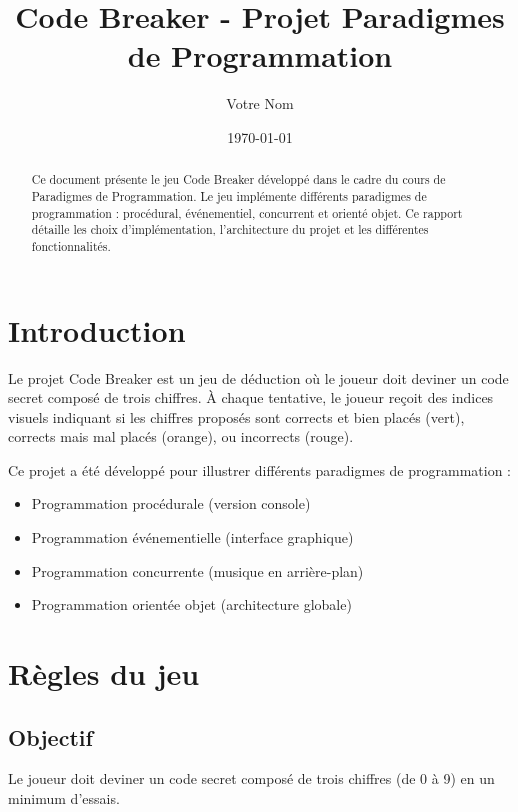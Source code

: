 \documentclass{article}
\title{Code Breaker - Projet Paradigmes de Programmation}
\author{Votre Nom}
\date{\today}
\begin{document}
\maketitle

\begin{abstract}
Ce document présente le jeu Code Breaker développé dans le cadre du cours de Paradigmes de Programmation. Le jeu implémente différents paradigmes de programmation : procédural, événementiel, concurrent et orienté objet. Ce rapport détaille les choix d'implémentation, l'architecture du projet et les différentes fonctionnalités.
\end{abstract}

\tableofcontents

\newpage

\section{Introduction}

Le projet Code Breaker est un jeu de déduction où le joueur doit deviner un code secret composé de trois chiffres. À chaque tentative, le joueur reçoit des indices visuels indiquant si les chiffres proposés sont corrects et bien placés (vert), corrects mais mal placés (orange), ou incorrects (rouge).

Ce projet a été développé pour illustrer différents paradigmes de programmation :
\begin{itemize}
    \item Programmation procédurale (version console)
    \item Programmation événementielle (interface graphique)
    \item Programmation concurrente (musique en arrière-plan)
    \item Programmation orientée objet (architecture globale)
\end{itemize}

\section{Règles du jeu}

\subsection{Objectif}
Le joueur doit deviner un code secret composé de trois chiffres (de 0 à 9) en un minimum d'essais.
\end{document}

